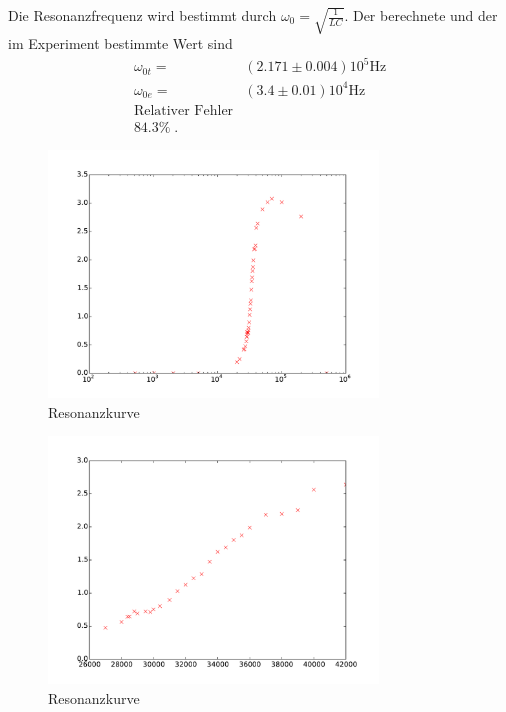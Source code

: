 Die Resonanzfrequenz wird bestimmt durch $\omega_0=\sqrt{\frac{1}{LC}}$.
Der berechnete und der im Experiment bestimmte Wert sind
\begin{align*}
\omega_{0t}=&(2.171\pm0.004)10^5\si{\hertz}\\
\omega_{0e}=&(3.4\pm0.01)10^4\si{\hertz}\\
\text{Relativer Fehler}\\
84.3\%\;.
\end{align*}
\begin{figure}
  \centering
  \includegraphics[width=0.78\textwidth]{phasenverschiebung.pdf}
  \caption{Resonanzkurve}
  \label{fig:phasenverschiebung}
\end{figure}
\begin{figure}
  \centering
  \includegraphics[width=0.78\textwidth]{linphasenverschiebung.pdf}
  \caption{Resonanzkurve}
  \label{fig:linphasenverschiebung}
\end{figure}

